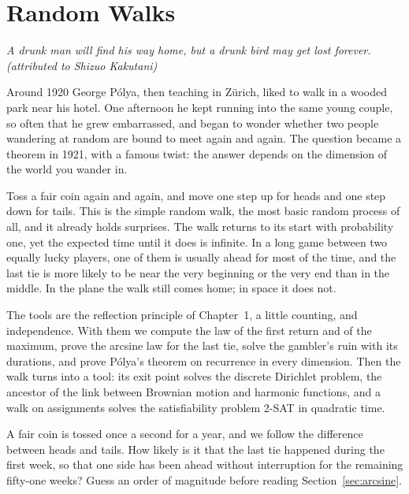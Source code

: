 \chapter{Random Walks}

\begin{center}\itshape
A drunk man will find his way home, but a drunk bird may get lost forever.\\
\upshape(attributed to Shizuo Kakutani)
\end{center}

Around 1920 George P\'olya, then teaching in Z\"urich, liked to walk in a wooded park near his hotel. One afternoon he kept running into the same
young couple, so often that he grew embarrassed, and began to wonder whether two people wandering at random are bound to meet again and again.
The question became a theorem in 1921, with a famous twist: the answer depends on the dimension of the world you wander in.

Toss a fair coin again and again, and move one step up for heads and one step down for tails. This is the simple
random walk, the most basic random process of all, and it already holds surprises. The walk returns to its start
with probability one, yet the expected time until it does is infinite. In a long game between two equally lucky
players, one of them is usually ahead for most of the time, and the last tie is more likely to be near the very
beginning or the very end than in the middle. In the plane the walk still comes home; in space it does not.

The tools are the reflection principle of Chapter~1, a little counting, and independence. With them we compute the
law of the first return and of the maximum, prove the arcsine law for the last tie, solve the gambler's ruin with
its durations, and prove Pólya's theorem on recurrence in every dimension. Then the walk turns into a tool: its
exit point solves the discrete Dirichlet problem, the ancestor of the link between Brownian motion and harmonic
functions, and a walk on assignments solves the satisfiability problem 2-SAT in quadratic time.

\begin{think}
A fair coin is tossed once a second for a year, and we follow the difference between heads and tails. How likely
is it that the last tie happened during the first week, so that one side has been ahead without interruption for
the remaining fifty-one weeks? Guess an order of magnitude before reading Section~\ref{sec:arcsine}.
\end{think}

